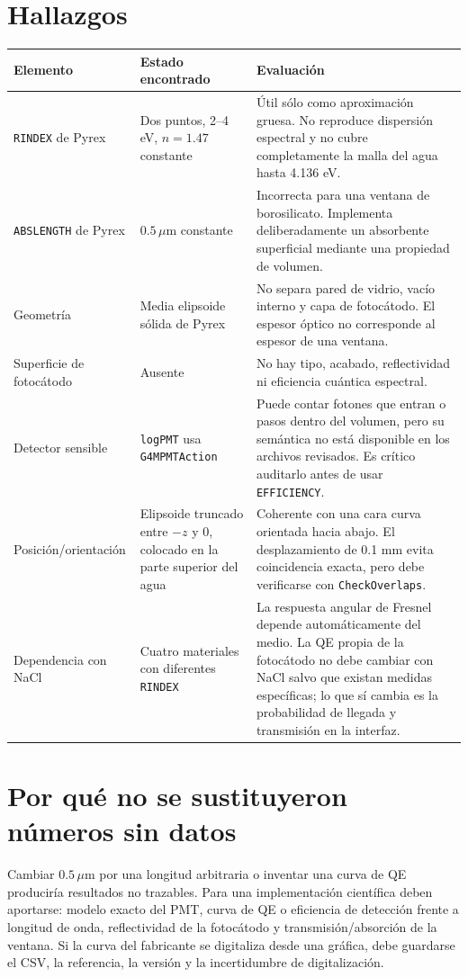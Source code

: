 \documentclass[11pt,a4paper]{article}
\begin{document}
\section{Hallazgos}
\begin{longtable}{p{}p{}p{}}
\toprule
Elemento & Estado encontrado & Evaluación \\
\midrule
\endhead
\texttt{RINDEX} de Pyrex & Dos puntos, 2--4 eV, $n=1.47$ constante &
Útil sólo como aproximación gruesa. No reproduce dispersión espectral y no
cubre completamente la malla del agua hasta 4.136 eV. \\
\texttt{ABSLENGTH} de Pyrex & $0.5\,\mu$m constante &
Incorrecta para una ventana de borosilicato. Implementa deliberadamente un
absorbente superficial mediante una propiedad de volumen. \\
Geometría & Media elipsoide sólida de Pyrex &
No separa pared de vidrio, vacío interno y capa de fotocátodo. El espesor óptico
no corresponde al espesor de una ventana. \\
Superficie de fotocátodo & Ausente &
No hay tipo, acabado, reflectividad ni eficiencia cuántica espectral. \\
Detector sensible & \texttt{logPMT} usa \texttt{G4MPMTAction} &
Puede contar fotones que entran o pasos dentro del volumen, pero su semántica no
está disponible en los archivos revisados. Es crítico auditarlo antes de usar
\texttt{EFFICIENCY}. \\
Posición/orientación & Elipsoide truncado entre $-z$ y 0, colocado en la parte
superior del agua & Coherente con una cara curva orientada hacia abajo. El
desplazamiento de 0.1 mm evita coincidencia exacta, pero debe verificarse con
\texttt{CheckOverlaps}. \\
Dependencia con NaCl & Cuatro materiales con diferentes \texttt{RINDEX} &
La respuesta angular de Fresnel depende automáticamente del medio. La QE propia
de la fotocátodo no debe cambiar con NaCl salvo que existan medidas específicas;
lo que sí cambia es la probabilidad de llegada y transmisión en la interfaz. \\
\bottomrule
\end{longtable}

\section{Por qué no se sustituyeron números sin datos}
Cambiar $0.5\,\mu$m por una longitud arbitraria o inventar una curva de QE
produciría resultados no trazables. Para una implementación científica deben
aportarse: modelo exacto del PMT, curva de QE o eficiencia de detección frente a
longitud de onda, reflectividad de la fotocátodo y transmisión/absorción de la
ventana. Si la curva del fabricante se digitaliza desde una gráfica, debe
guardarse el CSV, la referencia, la versión y la incertidumbre de digitalización.
\end{document}
